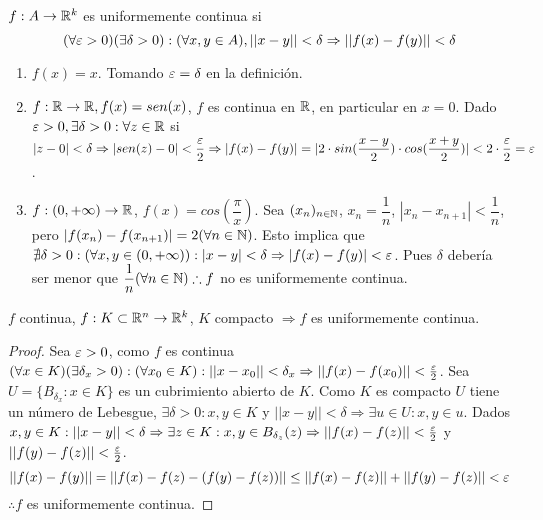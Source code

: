 \begin{definition}
  $f: A \to \mathbb{R}^k$ es uniformemente continua si \begin{equation}
    (\forall \varepsilon > 0)(\exists \delta > 0) : (\forall x,y \in A), ||x-y|| < \delta \Rightarrow ||f(x) - f(y)|| < \delta
  \end{equation}
\end{definition}

\begin{eg}
  \begin{enumerate}
    \item $f(x) = x$. Tomando $\varepsilon = \delta$ en la definición.
    \item $f: \mathbb{R} \to \mathbb{R}, f(x) = sen(x)$, $f$ es continua en $\mathbb{R}$, en particular en $x = 0$. Dado $\varepsilon > 0, \exists \delta > 0 : \forall z \in \mathbb{R}$ si $|z-0| < \delta \Rightarrow |sen(z) - 0| < \dfrac{\varepsilon}{2} \Rightarrow |f(x) - f(y)| = |2 \cdot sin(\dfrac{x-y}{2}) \cdot cos(\dfrac{x+y}{2})| < 2 \cdot \dfrac{\varepsilon}{2} = \varepsilon$.
    \item $f: (0, +\infty) \to \mathbb{R}$, $f(x) = cos(\dfrac{\pi}{x})$. Sea $(x_n)_{n \in \mathbb{N}}$, $x_n = \dfrac{1}{n}$, $|x_n - x_{n+1}| < \dfrac{1}{n}$, pero $|f(x_n) - f(x_{n+1})| = 2 (\forall n \in \mathbb{N})$. Esto implica que $\nexists \delta > 0 : (\forall x,y \in (0, +\infty)) : |x-y| < \delta \Rightarrow |f(x) - f(y)| < \varepsilon$. Pues $\delta$ debería ser menor que $\dfrac{1}{n} (\forall n \in \mathbb{N}) \therefore f$ no es uniformemente continua.
  \end{enumerate}
\end{eg}

\begin{theorem}
  $f$ continua, $f: K \subset \mathbb{R}^n \to \mathbb{R}^k$, $K$ compacto $\Rightarrow f$ es uniformemente continua.
  \begin{proof}
    Sea $\varepsilon > 0$, como $f$ es continua $(\forall x \in K)(\exists \delta_x > 0) : (\forall x_0 \in K) : ||x - x_0|| < \delta_x \Rightarrow ||f(x) - f(x_0)|| < \frac{\varepsilon}{2}$. Sea $U = \{B_{\delta_x} : x \in K\}$ es un cubrimiento abierto de $K$. Como $K$ es compacto $U$ tiene un número de Lebesgue, $\exists \delta > 0 : x, y \in K$ y $ ||x-y|| < \delta \Rightarrow \exists u \in U : x, y \in u$. Dados $x, y \in K : ||x-y|| < \delta \Rightarrow \exists z \in K : x, y \in B_{\delta_z}(z) \Rightarrow ||f(x) - f(z)|| < \frac{\varepsilon}{2}$ y $||f(y) - f(z)|| < \frac{\varepsilon}{2}$. 
    \begin{equation}
      ||f(x) - f(y)|| = ||f(x) - f(z) - (f(y) - f(z))|| \leq ||f(x) - f(z)|| + ||f(y) - f(z)|| < \varepsilon
    \end{equation} $\therefore f$ es uniformemente continua.
  \end{proof}
\end{theorem}

